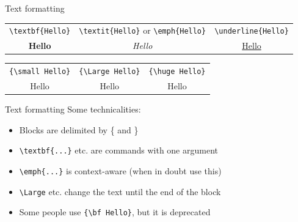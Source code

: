 \documentclass[11pt]{beamer}
\newcommand{\bs}{\textbackslash}
\begin{document}
\begin{frame}{Text formatting}
  \begin{center}

    \begin{tabular}{ccc}
      \texttt{\small \bs textbf\{Hello\}} &
      \texttt{\small \bs textit\{Hello\}} or \texttt{\small\bs emph\{Hello\}} &
      \texttt{\small \bs underline\{Hello\}} \\
      \textbf{Hello} & \textit{Hello} & \underline{Hello}
    \end{tabular}
  
    \vspace{0.7cm}
      \begin{tabular}{ccc}
      \texttt{\small \{\bs small Hello\}} & \hspace{1cm}
      \texttt{\small \{\bs Large Hello\}} \hspace{1cm} &
      \texttt{\small \{\bs huge Hello\}} \\
      {\small Hello} & {\Large Hello} & {\huge Hello}
    \end{tabular}

  \end{center}
\end{frame}

\begin{frame}{Text formatting}
  Some technicalities:
  \begin{itemize}
    \item Blocks are delimited by \{ and \}
    \item \texttt{\bs textbf\{...\}} etc. are commands with one argument
    \item \texttt{\bs emph\{...\}} is context-aware (when in doubt use this)
    \item \texttt{\bs Large} etc. change the text until the end of the block
    \item Some people use \texttt{\{\bs bf Hello\}}, but it is deprecated
  \end{itemize}
\end{frame}
\end{document}
